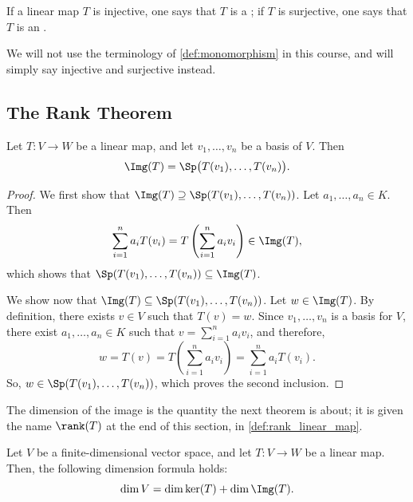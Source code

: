 \begin{definition}
\label{def:monomorphism}
If a linear map $T$ is injective, one says that $T$ is a ; if $T$ is surjective, one says that $T$ is an .
\end{definition}

\begin{remark}
We will not use the terminology of \cref{def:monomorphism} in this course, and will simply say injective and surjective instead.
\end{remark}

\subsection{The Rank Theorem}

\begin{lemma}
\label{lem:image_spanned_by_basis}
Let $T: V \to W$ be a linear map, and let $v_1, \dots, v_n$ be a basis of $V$. Then
\[
\Img(T) = \Sp\big(T(v_1), \dots, T(v_n)\big).
\]
\end{lemma}

\begin{proof}
We first show that $\Img(T) \supseteq \Sp(T(v_1), \dots, T(v_n))$. Let $a_1, \dots, a_n \in K$. Then
\[
\sum_{i=1}^{n} a_i T(v_i) = T\left( \sum_{i=1}^{n} a_i v_i \right) \in \Img(T),
\]
which shows that $\Sp(T(v_1), \dots, T(v_n)) \subseteq \Img(T)$.

We show now that $\Img(T) \subseteq \Sp(T(v_1), \dots, T(v_n))$. Let $w \in \Img(T)$. By definition, there exists $v \in V$ such that $T(v) = w$. Since $v_1, \dots, v_n$ is a basis for $V$, there exist $a_1, \dots, a_n \in K$ such that $v = \sum_{i=1}^{n} a_i v_i$, and therefore,
\[
w = T(v) = T\left( \sum_{i=1}^{n} a_i v_i \right) = \sum_{i=1}^{n} a_i T(v_i).
\]
So, $w \in \Sp(T(v_1), \dots, T(v_n))$, which proves the second inclusion.
\end{proof}

The dimension of the image is the quantity the next theorem is about; it is given the name $\rank(T)$ at the end of this section, in \cref{def:rank_linear_map}.

\begin{theorem}
\label{thm:rank_nullity}
Let $V$ be a finite-di\-men\-sional vector space, and let $T: V \to W$ be a linear map. Then, the following dimension formula holds:
\[
\dim V = \dim \ker(T) + \dim \Img(T).
\]
\end{theorem}

